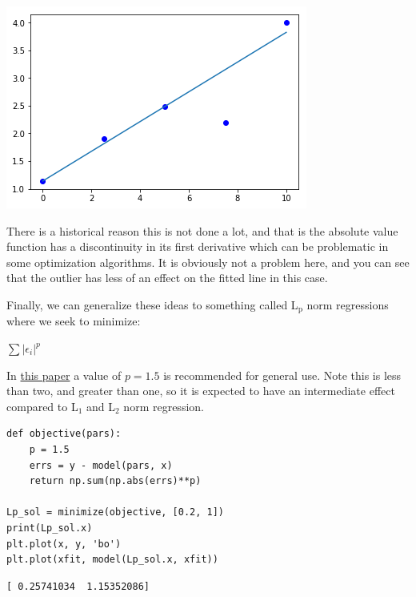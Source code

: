 \documentclass[11pt]{article}
\begin{document}
\begin{center}
\includegraphics[width=.9\linewidth]{obipy-resources/37c51028cef42d76546d882661b04271-20264wuA.png}
\end{center}

There is a historical reason this is not done a lot, and that is the absolute value function has a discontinuity in its first derivative which can be problematic in some optimization algorithms. It is obviously not a problem here, and you can see that the outlier has less of an effect on the fitted line in this case.

Finally, we can generalize these ideas to something called L\(_{\text{p}}\) norm regressions where we seek to minimize:

\(\sum |\epsilon_i|^p\)

In \href{https://www.tandfonline.com/doi/abs/10.1080/00401706.1972.10488892}{this paper} a value of \(p=1.5\) is recommended for general use. Note this is less than two, and greater than one, so it is expected to have an intermediate effect compared to L\(_{\text{1}}\) and L\(_{\text{2}}\) norm regression.

\begin{verbatim}
def objective(pars):
    p = 1.5
    errs = y - model(pars, x)
    return np.sum(np.abs(errs)**p)

Lp_sol = minimize(objective, [0.2, 1])
print(Lp_sol.x)
plt.plot(x, y, 'bo')
plt.plot(xfit, model(Lp_sol.x, xfit))
\end{verbatim}

\begin{verbatim}
[ 0.25741034  1.15352086]

\end{verbatim}
\end{document}
